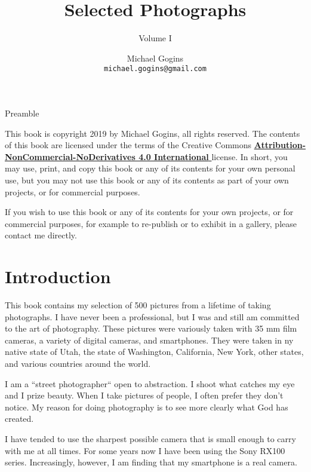  {Preamble}

\frontmatter
\title{Selected Photographs}
\author{Michael Gogins \\ \texttt{michael.gogins@gmail.com}}
\subtitle{Volume I}
\dedication{This book is for Mick.}
\newpage
\noindent This book is copyright 2019 by Michael Gogins, all rights reserved. The contents of this book are licensed under the terms of the Creative Commons \href{https://creativecommons.org/licenses/by-nc-nd/4.0/legalcode}{\textbf{Attribution-NonCommercial-NoDerivatives 4.0 International} } license. In short, you may use, print, and copy this book or any of its contents for your own personal use, but you may not use this book or any of its contents as part of your own projects, or for commercial purposes.

If you wish to use this book or any of its contents for your own projects, or for commercial purposes, for example to re-publish or to exhibit in a gallery, please contact me directly.
\maketitle

\tableofcontents
\listoffigures

\mainmatter
{}

\chapter{Introduction}

This book contains my selection of 500 pictures from a lifetime of taking photographs. I have never been a professional, but I was and still am committed to the art of photography. These pictures were variously taken with 35 mm film cameras, a variety of digital cameras, and smartphones. They were taken in ny native state of Utah, the state of Washington, California, New York, other states, and various countries around the world. 

I am a ``street photographer`` open to abstraction. I shoot what catches my eye and I prize beauty. When I take pictures of people, I often prefer they don't notice. My reason for doing photography is to see more clearly what God has created.

I have tended to use the sharpest possible camera that is small enough to carry with me at all times. For some years now I have been using the Sony RX100 series. Increasingly, however, I am finding that my smartphone is a real camera.

